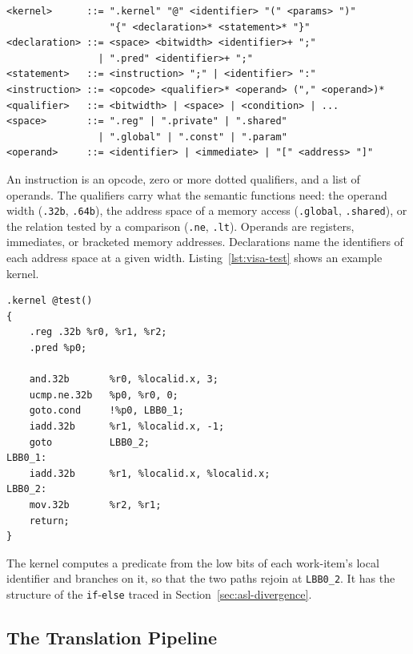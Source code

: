 \begin{lstlisting}[caption={Excerpt of the accepted PISA grammar. The
address forms of memory operands are omitted.}, label={lst:visa-grammar}]
<kernel>      ::= ".kernel" "@" <identifier> "(" <params> ")"
                  "{" <declaration>* <statement>* "}"
<declaration> ::= <space> <bitwidth> <identifier>+ ";"
                | ".pred" <identifier>+ ";"
<statement>   ::= <instruction> ";" | <identifier> ":"
<instruction> ::= <opcode> <qualifier>* <operand> ("," <operand>)*
<qualifier>   ::= <bitwidth> | <space> | <condition> | ...
<space>       ::= ".reg" | ".private" | ".shared"
                | ".global" | ".const" | ".param"
<operand>     ::= <identifier> | <immediate> | "[" <address> "]"
\end{lstlisting}

An instruction is an opcode, zero or more dotted qualifiers, and a list of
operands. The qualifiers carry what the semantic functions need: the
operand width (\texttt{.32b}, \texttt{.64b}), the address space of a memory
access (\texttt{.global}, \texttt{.shared}), or the relation tested by a
comparison (\texttt{.ne}, \texttt{.lt}). Operands are registers,
immediates, or bracketed memory addresses. Declarations name the
identifiers of each address space at a given width.
Listing~\ref{lst:visa-test} shows an example kernel.

\begin{lstlisting}[caption={The \texttt{@test} kernel, a handwritten sample
with a divergent \texttt{if}-\texttt{else}.}, label={lst:visa-test}]
.kernel @test()
{
    .reg .32b %r0, %r1, %r2;
    .pred %p0;

    and.32b       %r0, %localid.x, 3;
    ucmp.ne.32b   %p0, %r0, 0;
    goto.cond     !%p0, LBB0_1;
    iadd.32b      %r1, %localid.x, -1;
    goto          LBB0_2;
LBB0_1:
    iadd.32b      %r1, %localid.x, %localid.x;
LBB0_2:
    mov.32b       %r2, %r1;
    return;
}
\end{lstlisting}

The kernel computes a predicate from the low bits of each work-item's local
identifier and branches on it, so that the two paths rejoin at
\texttt{LBB0\_2}. It has the structure of the \texttt{if}-\texttt{else}
traced in Section~\ref{sec:asl-divergence}.

\subsection{The Translation Pipeline}
\label{sec:parser-pipeline}

